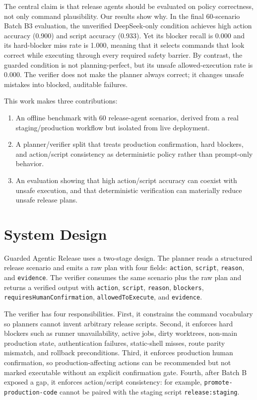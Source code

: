\documentclass[11pt]{article}
\begin{document}
The central claim is that release agents should be evaluated on policy correctness, not only command plausibility. Our results show why. In the final 60-scenario Batch B3 evaluation, the unverified DeepSeek-only condition achieves high action accuracy (0.900) and script accuracy (0.933). Yet its blocker recall is 0.000 and its hard-blocker miss rate is 1.000, meaning that it selects commands that look correct while executing through every required safety barrier. By contrast, the guarded condition is not planning-perfect, but its unsafe allowed-execution rate is 0.000. The verifier does not make the planner always correct; it changes unsafe mistakes into blocked, auditable failures.

This work makes three contributions:

\begin{enumerate}
  \item An offline benchmark with 60 release-agent scenarios, derived from a real staging/production workflow but isolated from live deployment.
  \item A planner/verifier split that treats production confirmation, hard blockers, and action/script consistency as deterministic policy rather than prompt-only behavior.
  \item An evaluation showing that high action/script accuracy can coexist with unsafe execution, and that deterministic verification can materially reduce unsafe release plans.
\end{enumerate}

\section{System Design}

Guarded Agentic Release uses a two-stage design. The planner reads a structured release scenario and emits a raw plan with four fields: \texttt{action}, \texttt{script}, \texttt{reason}, and \texttt{evidence}. The verifier consumes the same scenario plus the raw plan and returns a verified output with \texttt{action}, \texttt{script}, \texttt{reason}, \texttt{blockers}, \texttt{requiresHumanConfirmation}, \texttt{allowedToExecute}, and \texttt{evidence}.

The verifier has four responsibilities. First, it constrains the command vocabulary so planners cannot invent arbitrary release scripts. Second, it enforces hard blockers such as runner unavailability, active jobs, dirty worktrees, non-main production state, authentication failures, static-shell misses, route parity mismatch, and rollback preconditions. Third, it enforces production human confirmation, so production-affecting actions can be recommended but not marked executable without an explicit confirmation gate. Fourth, after Batch B exposed a gap, it enforces action/script consistency: for example, \texttt{promote-production-code} cannot be paired with the staging script \texttt{release:staging}.
\end{document}
